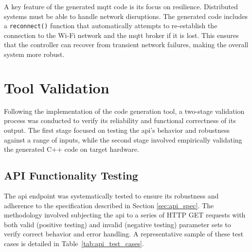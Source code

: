 A key feature of the generated \gls{mqtt} code is its focus on resilience. Distributed systems must be able to handle network disruptions. The generated code includes a \texttt{reconnect()} function that automatically attempts to re-establish the connection to the Wi-Fi network and the \gls{mqtt} broker if it is lost. This ensures that the controller can recover from transient network failures, making the overall system more robust.


\section{Tool Validation}
\label{sec:tool_validation}

  Following the implementation of the code generation tool, a two-stage validation process was conducted to verify its reliability and functional correctness of its output. The first stage focused on testing the \gls{api}'s behavior and robustness against a range of inputs, while the second stage involved empirically validating the generated C++ code on target hardware.

\subsection{API Functionality Testing}
\label{subsec:api_testing}

  The \gls{api} endpoint was systematically tested to ensure its robustness and adherence to the specification described in Section \ref{sec:api_spec}. The methodology involved subjecting the \gls{api} to a series of HTTP GET requests with both valid (positive testing) and invalid (negative testing) parameter sets to verify correct behavior and error handling. A representative sample of these test cases is detailed in Table~\ref{tab:api_test_cases}.

